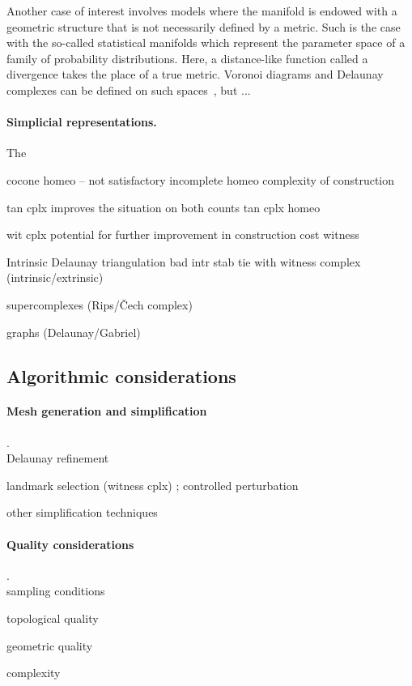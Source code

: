 Another case of interest involves models where the manifold is endowed
with a geometric structure that is not necessarily defined by a
metric. Such is the case with the so-called statistical manifolds
which represent the parameter space of a family of probability
distributions. Here, a distance-like function called a divergence
takes the place of a true metric.  Voronoi diagrams and Delaunay
complexes can be defined on such
spaces~\cite{onishi1998,boissonnat2010bregvor}, but ...

\paragraph{Simplicial representations.} 
The 

cocone homeo -- not satisfactory
incomplete homeo \cite{cairns1961,cheng2005}
complexity of construction 

tan cplx improves the situation on both counts
 \cite{boissonnat2010tan-socg}
tan cplx homeo \cite{boissonnat2011tancplx}

wit cplx potential for further improvement in construction cost
witness \cite{boissonnat2011cgl}

Intrinsic Delaunay triangulation
bad intr \cite{leibon2000}
stab \cite{boissonnat2012stab}
tie with
witness complex (intrinsic/extrinsic)


supercomplexes (Rips/\v{C}ech complex)

graphs (Delaunay/Gabriel)

\subsection*{Algorithmic considerations}

\paragraph{Mesh generation and simplification} .\\

Delaunay refinement 

landmark selection (witness cplx) ;  controlled perturbation

other simplification techniques

\paragraph{Quality considerations} .\\

sampling conditions

topological quality

geometric quality

complexity


